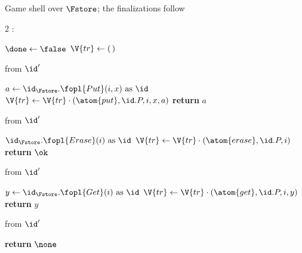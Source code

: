\documentclass[10pt,oneside,openany]{book}
\theoremstyle{accentdef}
\theoremstyle{accentplain}
\begin{document}
\begin{interface}[nofloat]{Game shell over $\Fstore$; the finalizations follow \\
}

{\scriptsize
\setlength{\columnsep}{1.4em}
\begin{multicols}{2}
:
\begin{algorithmic}[1]
\setcounter{contline}{0}\algcont
\State $\done \gets \false$
\State $\V{tr} \gets (\,)$
\algsave
\end{algorithmic}
\vspace{1.4ex}

 \quad from $\id'$
\begin{algorithmic}[1]
\algcont
\Req{$\neg\done$}
\State $a \gets \id_{\Fstore}.\fopl{Put}(i,x) \text{ as } \id$ \label{ln:gput}
\State $\V{tr} \gets \V{tr} \cdot (\atom{put},\id.P,i,x,a)$
\State \textbf{return} $a$
\algsave
\end{algorithmic}
\vspace{1.4ex}

 \quad from $\id'$
\begin{algorithmic}[1]
\algcont
\Req{$\neg\done$}
\State $\id_{\Fstore}.\fopl{Erase}(i) \text{ as } \id$
\State $\V{tr} \gets \V{tr} \cdot (\atom{erase},\id.P,i)$ \label{ln:gsterase}
\State \textbf{return} $\ok$
\algsave
\end{algorithmic}
\vspace{1.4ex}

\columnbreak

 \quad from $\id'$
\begin{algorithmic}[1]
\algcont
\Req{$\neg\done$}
\State $y \gets \id_{\Fstore}.\fopl{Get}(i) \text{ as } \id$ \label{ln:gget}
\State $\V{tr} \gets \V{tr} \cdot (\atom{get},\id.P,i,y)$
\State \textbf{return} $y$
\algsave
\end{algorithmic}
\vspace{1.4ex}

 \quad from $\id'$
\begin{algorithmic}[1]
\algcont
\State \textbf{return} $\none$
\algsave
\end{algorithmic}
\end{multicols}}
\end{interface}
\end{document}
